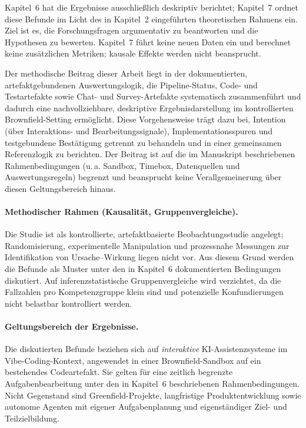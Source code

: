 Kapitel~6 hat die Ergebnisse ausschließlich deskriptiv berichtet; Kapitel~7 ordnet diese Befunde im Licht des in Kapitel~2 eingeführten theoretischen Rahmens ein.
Ziel ist es, die Forschungsfragen argumentativ zu beantworten und die Hypothesen zu bewerten.
Kapitel~7 führt keine neuen Daten ein und berechnet keine zusätzlichen Metriken; kausale Effekte werden nicht beansprucht.

Der methodische Beitrag dieser Arbeit liegt in der dokumentierten, artefaktgebundenen Auswertungslogik, die Pipeline-Status, Code- und Testartefakte sowie Chat- und Survey-Artefakte systematisch zusammenführt und dadurch eine nachvollziehbare, deskriptive Ergebnisdarstellung im kontrollierten Brownfield-Setting ermöglicht. Diese Vorgehensweise trägt dazu bei, Intention (über Interaktions- und Bearbeitungssignale), Implementationsspuren und testgebundene Bestätigung getrennt zu behandeln und in einer gemeinsamen Referenzlogik zu berichten. Der Beitrag ist auf die im Manuskript beschriebenen Rahmenbedingungen (u.\,a. Sandbox, Timebox, Datenquellen und Auswertungsregeln) begrenzt und beansprucht keine Verallgemeinerung über diesen Geltungsbereich hinaus.

\paragraph{Methodischer Rahmen (Kausalität, Gruppenvergleiche).}
Die Studie ist als kontrollierte, artefaktbasierte Beobachtungsstudie angelegt; Randomisierung, experimentelle Manipulation und prozessnahe Messungen zur Identifikation von Ursache--Wirkung liegen nicht vor.
Aus diesem Grund werden die Befunde als Muster unter den in Kapitel~6 dokumentierten Bedingungen diskutiert.
Auf inferenzstatistische Gruppenvergleiche wird verzichtet, da die Fallzahlen pro Kompetenzgruppe klein sind und potenzielle Konfundierungen nicht belastbar kontrolliert werden.

\paragraph{Geltungsbereich der Ergebnisse.}
Die diskutierten Befunde beziehen sich auf \emph{interaktive} KI-Assistenzsysteme im Vibe-Coding-Kontext, angewendet in einer Brownfield-Sandbox auf ein bestehendes Codeartefakt.
Sie gelten für eine zeitlich begrenzte Aufgabenbearbeitung unter den in Kapitel~6 beschriebenen Rahmenbedingungen.
Nicht Gegenstand sind Greenfield-Projekte, langfristige Produktentwicklung sowie autonome Agenten mit eigener Aufgabenplanung und eigenständiger Ziel- und Teilzielbildung.

